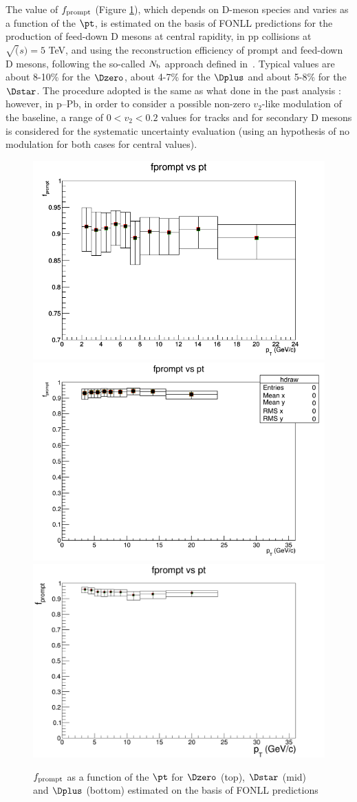The value of $f_{\rm prompt}$ (Figure \ref{fprompt}), which depends on D-meson species and varies as a function of the $\pt$, is estimated on the basis of FONLL predictions for the production of feed-down D mesons at central rapidity, in pp collisions at $\sqrt(s) = 5$ TeV, and using the reconstruction efficiency of prompt and feed-down D mesons, following the so-called $N_{\rm b}$ approach defined in~\cite{ALICEDmespp7Tev}. Typical values are about 8-10\% for the
$\Dzero$, about 4-7\% for the $\Dplus$ and about 5-8\% for the $\Dstar$. The procedure adopted is the same as what done in the past analysis \cite{Notepp}: however, in p--Pb, in order to consider a possible non-zero $v_{2}$-like modulation of the baseline, a range of $0<v_{2}<0.2$ values for tracks and for secondary D mesons is considered for the systematic uncertainty evaluation (using an hypothesis of no modulation for both cases for central values).

\begin{figure}
\centering
\includegraphics[width=0.6\linewidth]{figures/Effs/fprompt_D0.png}
\includegraphics[width=0.6\linewidth]{figures/Effs/fPrompt_Dstar.png}
\includegraphics[width=0.6\linewidth]{figures/Effs/fpromptDplus.png}
\caption{$f_{\rm prompt}$ as a function of the $\pt$ for $\Dzero$ (top), $\Dstar$ (mid) and $\Dplus$ (bottom) estimated on the basis of FONLL predictions}
\label{fprompt}
\end{figure}

